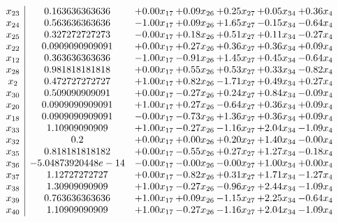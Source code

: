 \documentclass[8pt]{article}
\begin{document}
\[\begin{array}{c| c c@{\hskip 2pt} c@{\hskip 2pt} c@{\hskip 2pt} c@{\hskip 2pt} c@{\hskip 2pt} }
 x_{23}   &  0.163636363636 & +  0.00 x_{17} & +  0.09 x_{26} & +  0.25 x_{27} & +  0.05 x_{34} & +  0.36 x_{4}\\
 x_{24}   &  0.563636363636 & -1.00 x_{17} & +  0.09 x_{26} & +  1.65 x_{27} & -0.15 x_{34} & -0.64 x_{4}\\
 x_{25}   &  0.327272727273 & -0.00 x_{17} & +  0.18 x_{26} & +  0.51 x_{27} & +  0.11 x_{34} & -0.27 x_{4}\\
 x_{22}   &  0.0909090909091 & +  0.00 x_{17} & +  0.27 x_{26} & +  0.36 x_{27} & +  0.36 x_{34} & +  0.09 x_{4}\\
 x_{12}   &  0.363636363636 & -1.00 x_{17} & -0.91 x_{26} & +  1.45 x_{27} & +  0.45 x_{34} & -0.64 x_{4}\\
 x_{28}   &  0.981818181818 & +  0.00 x_{17} & +  0.55 x_{26} & +  0.53 x_{27} & +  0.33 x_{34} & -0.82 x_{4}\\
 x_{2}   &  0.472727272727 & +  1.00 x_{17} & +  0.82 x_{26} & -1.71 x_{27} & +  0.49 x_{34} & +  0.27 x_{4}\\
 x_{30}   &  0.509090909091 & +  0.00 x_{17} & -0.27 x_{26} & +  0.24 x_{27} & +  0.84 x_{34} & -0.09 x_{4}\\
 x_{20}   &  0.0909090909091 & +  1.00 x_{17} & +  0.27 x_{26} & -0.64 x_{27} & +  0.36 x_{34} & +  0.09 x_{4}\\
 x_{18}   &  0.0909090909091 & -0.00 x_{17} & -0.73 x_{26} & +  1.36 x_{27} & +  0.36 x_{34} & +  0.09 x_{4}\\
 x_{33}   &  1.10909090909 & +  1.00 x_{17} & -0.27 x_{26} & -1.16 x_{27} & +  2.04 x_{34} & -1.09 x_{4}\\
 x_{32}   &  0.2 & +  0.00 x_{17} & +  0.00 x_{26} & +  0.20 x_{27} & +  1.40 x_{34} & -0.00 x_{4}\\
 x_{35}   &  0.818181818182 & +  0.00 x_{17} & -0.55 x_{26} & +  0.27 x_{27} & +  1.27 x_{34} & -0.18 x_{4}\\
 x_{36}   &  -5.04873920448e-14 & -0.00 x_{17} & -0.00 x_{26} & -0.00 x_{27} & +  1.00 x_{34} & +  0.00 x_{4}\\
 x_{37}   &  1.12727272727 & +  0.00 x_{17} & -0.82 x_{26} & +  0.31 x_{27} & +  1.71 x_{34} & -1.27 x_{4}\\
 x_{38}   &  1.30909090909 & +  1.00 x_{17} & -0.27 x_{26} & -0.96 x_{27} & +  2.44 x_{34} & -1.09 x_{4}\\
 x_{39}   &  0.763636363636 & +  1.00 x_{17} & +  0.09 x_{26} & -1.15 x_{27} & +  2.25 x_{34} & -0.64 x_{4}\\
 x_{40}   &  1.10909090909 & +  1.00 x_{17} & -0.27 x_{26} & -1.16 x_{27} & +  2.04 x_{34} & -1.09 x_{4}\\

\end{array}\]
\end{document}
